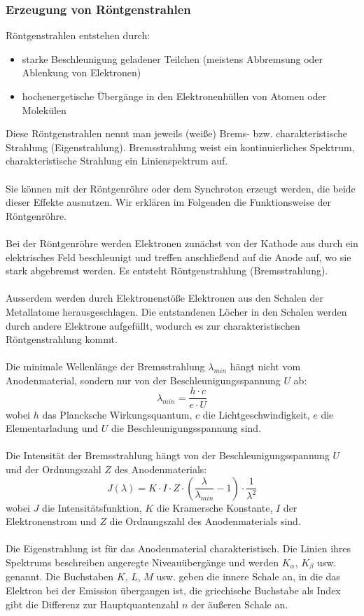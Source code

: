 \documentclass[a4paper,titlepage]{scrartcl}
\numberwithin{equation}{section}
\begin{document}
\subsubsection{Erzeugung von Röntgenstrahlen}
Röntgenstrahlen entstehen durch:
\begin{itemize}
\item starke Beschleunigung geladener Teilchen (meistens Abbremsung oder Ablenkung von Elektronen)
\item hochenergetische Übergänge in den Elektronenhüllen von Atomen oder Molekülen
\end{itemize}
Diese Röntgenstrahlen nennt man jeweils (weiße) Brems- bzw. charakteristische Strahlung (Eigenstrahlung). Bremsstrahlung weist ein kontinuierliches Spektrum, charakteristische Strahlung ein Linienspektrum auf.\\ \\
Sie können mit der Röntgenröhre oder dem Synchroton erzeugt werden, die beide dieser Effekte ausnutzen. Wir erklären im Folgenden die Funktionsweise der Röntgenröhre.\\ \\
Bei der Röntgenröhre werden Elektronen zunächst von der Kathode aus durch ein elektrisches Feld beschleunigt und treffen anschließend auf die Anode auf, wo sie stark abgebremst werden. Es entsteht Röntgenstrahlung (Bremsstrahlung).\\ \\
Ausserdem werden durch Elektronenstöße Elektronen aus den Schalen der Metallatome herausgeschlagen. Die entstandenen Löcher in den Schalen werden durch andere Elektrone aufgefüllt, wodurch es zur charakteristischen Röntgenstrahlung kommt.\\ \\
Die minimale Wellenlänge der Bremsstrahlung $\lambda_{min}$ hängt nicht vom Anodenmaterial, sondern nur von der Beschleunigungsspannung $U$ ab:
\begin{equation*}
\lambda_{min}=\frac{h \cdot c}{e \cdot U}
\end{equation*}
wobei $h$ das Plancksche Wirkungsquantum, $c$ die Lichtgeschwindigkeit, $e$ die Elementarladung und $U$ die Beschleunigungsspannung sind.\\ \\
Die Intensität der Bremsstrahlung hängt von der Beschleunigungsspannung $U$ und der Ordnungszahl $Z$ des Anodenmaterials:
\begin{equation*}
J(\lambda)=K \cdot I \cdot Z \cdot \left( \frac{\lambda}{\lambda_{min}} - 1 \right) \cdot \frac{1}{\lambda^2}
\end{equation*}
wobei $J$ die Intensitätsfunktion, $K$ die Kramersche Konstante, $I$ der Elektronenstrom und $Z$ die Ordnungszahl des Anodenmaterials sind.\\ \\
Die Eigenstrahlung ist für das Anodenmaterial charakteristisch. Die Linien ihres Spektrums beschreiben angeregte Niveauübergänge und werden $K_{\alpha}$, $K_{\beta}$ usw. genannt. Die Buchstaben $K$, $L$, $M$ usw. geben die innere Schale an, in die das Elektron bei der Emission übergangen ist, die griechische Buchstabe als Index gibt die Differenz zur Hauptquantenzahl $n$ der äußeren Schale an.
\end{document}
